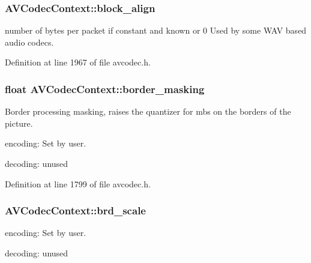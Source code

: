 \subsubsection[{\texorpdfstring{block\+\_\+align}{block_align}}]{ A\+V\+Codec\+Context\+::block\+\_\+align}\hypertarget{struct_a_v_codec_context_ae56433cc80666ff63af59db4de5b5e45}{}\label{struct_a_v_codec_context_ae56433cc80666ff63af59db4de5b5e45}
number of bytes per packet if constant and known or 0 Used by some W\+AV based audio codecs. 

Definition at line 1967 of file avcodec.\+h.

\subsubsection[{\texorpdfstring{border\+\_\+masking}{border_masking}}]{\setlength{\rightskip}{0pt plus 5cm}float A\+V\+Codec\+Context\+::border\+\_\+masking}\hypertarget{struct_a_v_codec_context_afab4d246910b59d598001e83b9cb2330}{}\label{struct_a_v_codec_context_afab4d246910b59d598001e83b9cb2330}
Border processing masking, raises the quantizer for mbs on the borders of the picture.
\begin{DoxyItemize}
\item encoding\+: Set by user.
\item decoding\+: unused 
\end{DoxyItemize}

Definition at line 1799 of file avcodec.\+h.

\subsubsection[{\texorpdfstring{brd\+\_\+scale}{brd_scale}}]{ A\+V\+Codec\+Context\+::brd\+\_\+scale}\hypertarget{struct_a_v_codec_context_a29c103eacc35d3d43c2022ac4ceb33a1}{}\label{struct_a_v_codec_context_a29c103eacc35d3d43c2022ac4ceb33a1}

\begin{DoxyItemize}
\item encoding\+: Set by user.
\item decoding\+: unused 
\end{DoxyItemize}

